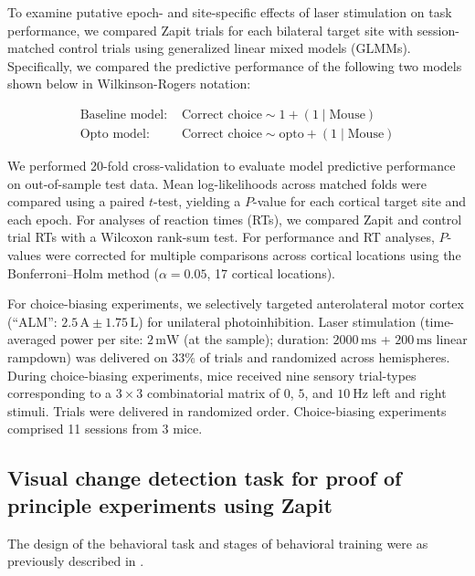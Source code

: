 To examine putative epoch- and site-specific effects of laser stimulation on task performance, we compared Zapit trials for each bilateral target site with session-matched control trials using generalized linear mixed models (GLMMs).
Specifically, we compared the predictive performance of the following two models shown below in Wilkinson-Rogers notation:

\[
\begin{aligned}
\text{Baseline model: } & \text{Correct choice} \sim 1 + (1 \mid \text{Mouse}) \\
\text{Opto model: } & \text{Correct choice} \sim \text{opto} + (1 \mid \text{Mouse})
\end{aligned}
\]

We performed 20-fold cross-validation to evaluate model predictive performance on out-of-sample test data.
Mean log-likelihoods across matched folds were compared using a paired $t$-test, yielding a $P$-value for each cortical target site and each epoch.
For analyses of reaction times (RTs), we compared Zapit and control trial RTs with a Wilcoxon rank-sum test.
For performance and RT analyses, $P$-values were corrected for multiple comparisons across cortical locations using the Bonferroni--Holm method ($\alpha = 0.05$, 17 cortical locations).

For choice-biasing experiments, we selectively targeted anterolateral motor cortex (``ALM'': $2.5\,\mathrm{A} \pm 1.75\,\mathrm{L}$) for unilateral photoinhibition.
Laser stimulation (time-averaged power per site: $2\,\mathrm{mW}$ (at the sample); duration: $2000\,\mathrm{ms}$ + $200\,\mathrm{ms}$ linear rampdown) was delivered on $33\%$ of trials and randomized across hemispheres.
During choice-biasing experiments, mice received nine sensory trial-types corresponding to a $3 \times 3$ combinatorial matrix of $0$, $5$, and $10~\mathrm{Hz}$ left and right stimuli.
Trials were delivered in randomized order.
Choice-biasing experiments comprised 11 sessions from 3 mice.




\subsection{Visual change detection task for proof of principle experiments using Zapit}
The design of the behavioral task and stages of behavioral training were as previously described in \cite{Orsolic2021MesoscaleDecision-making.}.

